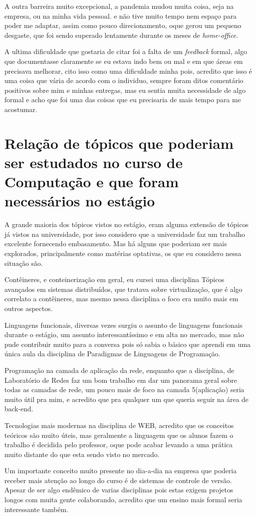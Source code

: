 \documentclass{ufscar}
\begin{document}
A outra barreira muito excepcional, a pandemia mudou muita coisa, seja na empresa, ou na minha vida pessoal. e não tive muito tempo nem espaço para poder me adaptar, assim como pouco direcionamento, oque gerou um pequeno desgaste, que foi sendo superado lentamente durante os meses de \textit{home-office}.

A ultima dificuldade que gostaria de citar foi a falta de um \textit{feedback} formal, algo que documentasse claramente se eu estava indo bem ou mal e em que áreas em precisava melhorar, cito isso como uma dificuldade minha pois, acredito que isso é uma coisa que vária de acordo com o individuo, sempre foram ditos comentário positivos sobre mim e minhas entregas, mas eu sentia muita necessidade de algo formal e acho que foi uma das coisas que eu precisaria de mais tempo para me acostumar. 

\section{Relação de tópicos que poderiam ser estudados no curso de Computação e que foram necessários no estágio}

A grande maioria dos tópicos vistos no estágio, eram alguma extensão de tópicos já vistos na universidade, por isso considero que a universidade faz um trabalho excelente fornecendo embasamento. Mas há alguns que poderiam ser mais explorados, principalmente como matérias optativas, os que eu considero nessa situação são.

Contêineres, e conteinerização em geral, eu cursei uma disciplina Tópicos avançados em sistemas distribuídos, que tratava sobre virtualização, que é algo correlato a contêineres, mas mesmo nessa disciplina o foco era muito mais em outros aspectos.

Linguagens funcionais, diversas vezes surgiu o assunto de linguagens funcionais durante o estágio, um assunto interessantíssimo e em alta no mercado, mas não pude contribuir muito para a conversa pois só sabia o básico que aprendi em uma única aula da disciplina de Paradigmas de Linguagens de Programação.

Programação na camada de aplicação da rede, enquanto que a disciplina, de Laboratório de Redes faz um bom trabalho em dar um panorama geral sobre todas as camadas de rede, um pouco mais de foco na camada 5(aplicação) seria muito útil pra mim, e acredito que pra qualquer um que queria seguir na área de back-end.

Tecnologias mais modernas na disciplina de WEB, acredito que os conceitos teóricos são muito úteis, mas geralmente a linguagem que os alunos fazem o trabalho é decidida pelo professor, oque pode acabar levando a uma prática muito distante do que esta sendo visto no mercado.


Um importante conceito muito presente no dia-a-dia na empresa que poderia receber mais atenção ao longo do curso é de sistemas de controle de versão. Apesar de ser algo endêmico de varias disciplinas pois estas exigem projetos longos com muita gente colaborando, acredito que um ensino mais formal seria interessante também.
\end{document}
